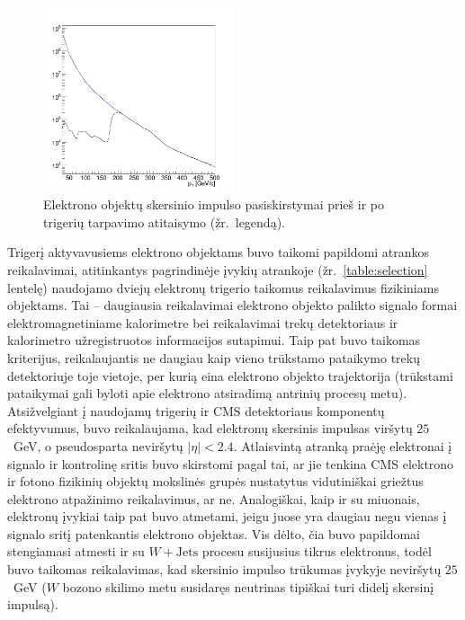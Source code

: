 \documentclass[a4paper, 12pt, oneside]{article}
\newcommand{\WJets}{W\! +\!\mathrm{Jets}}
\begin{document}
\begin{figure}[t!]
	\includegraphics[width=0.5\textwidth]{Magistrinis/prescale.png}
	\vspace{-0.5cm}
	\caption{\label{fig:prescale} Elektrono objektų skersinio impulso pasiskirstymai prieš ir po trigerių tarpavimo
	atitaisymo (žr.\ legendą).}
\end{figure}

Trigerį aktyvavusiems elektrono objektams buvo taikomi papildomi atrankos reikalavimai, atitinkantys pagrindinėje įvykių
atrankoje (žr.\ \ref{table:selection} lentelę) naudojamo dviejų elektronų trigerio taikomus reikalavimus fizikiniams objektams.
Tai -- daugiausia reikalavimai elektrono objekto palikto signalo formai elektromagnetiniame kalorimetre bei reikalavimai
trekų detektoriaus ir kalorimetro užregistruotos informacijos sutapimui.
Taip pat buvo taikomas kriterijus, reikalaujantis ne daugiau kaip vieno trūkstamo pataikymo trekų detektoriuje toje vietoje, per
kurią eina elektrono objekto trajektorija (trūkstami pataikymai gali byloti apie elektrono atsiradimą antrinių procesų metu).
Atsižvelgiant į naudojamų trigerių ir CMS detektoriaus komponentų efektyvumus, buvo reikalaujama, kad elektronų skersinis
impulsas viršytų $25$~GeV, o pseudosparta neviršytų $|\eta|<2.4$.
Atlaisvintą atranką praėję elektronai į signalo ir kontrolinę sritis buvo skirstomi pagal tai, ar jie tenkina CMS elektrono
ir fotono fizikinių objektų mokslinės grupės nustatytus vidutiniškai griežtus elektrono atpažinimo reikalavimus, ar ne.
Analogiškai, kaip ir su miuonais, elektronų įvykiai taip pat buvo atmetami, jeigu juose yra daugiau negu vienas į signalo
sritį patenkantis elektrono objektas.
Vis dėlto, čia buvo papildomai stengiamasi atmesti ir su $\WJets$ procesu susijusius tikrus elektronus, todėl buvo taikomas
reikalavimas, kad skersinio impulso trūkumas įvykyje neviršytų $25$~GeV ($W$ bozono skilimo metu susidaręs neutrinas tipiškai
turi didelį skersinį impulsą).
\end{document}
